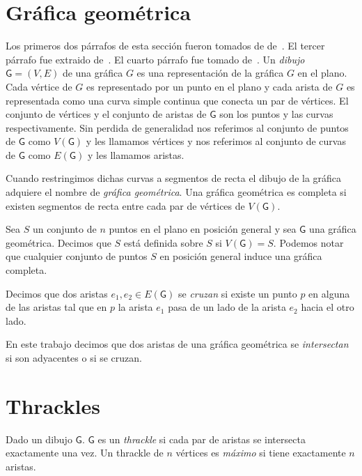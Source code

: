 \section{Gráfica geométrica}
Los primeros dos párrafos de esta sección fueron tomados de de~\cite{Pach2013}. El tercer párrafo
fue extraido de~\cite{Lara2019}. El cuarto párrafo fue tomado de~\cite{Pach2011}.
Un \emph{dibujo} $\mathsf{G}=(V,E)$ de una gráfica $G$ es una representación de la
gráfica $G$ en el plano. Cada vértice de $G$ es representado por un punto en el plano
y cada arista de $G$ es representada como una curva simple continua que conecta un par de vértices.
El conjunto de vértices y el conjunto de aristas de $\mathsf{G}$
son los puntos y las curvas respectivamente. Sin perdida de generalidad nos referimos al
conjunto de puntos de $\mathsf{G}$ como $V(\mathsf{G})$ y les llamamos vértices y nos
referimos al conjunto de curvas de $\mathsf{G}$ como $E(\mathsf{G})$ y les llamamos aristas.

Cuando restringimos dichas curvas a segmentos de recta el dibujo de la gráfica
adquiere el nombre de \emph{gráfica geométrica}. Una gráfica
geométrica es completa si existen segmentos de recta entre cada par de vértices
de $V(\mathsf{G})$.

Sea $S$ un conjunto de $n$ puntos en el plano en posición general y sea $\mathsf{G}$
una gráfica geométrica. Decimos que $S$ está definida sobre $S$ si $V(\mathsf{G}) = S$.
Podemos notar que cualquier conjunto de puntos $S$ en posición
general induce una gráfica completa.

Decimos que dos aristas $e_1,e_2 \in E(\mathsf{G})$ se \emph{cruzan} si existe un punto $p$
en alguna de las aristas tal que en $p$ la arista $e_1$ pasa de un lado de la arista
$e_2$ hacia el otro lado.

En este trabajo decimos que dos aristas de una gráfica geométrica se \emph{intersectan}
si son adyacentes o si se cruzan.

\section{Thrackles}
Dado un dibujo $\mathsf{G}$. $\mathsf{G}$ es un \emph{thrackle} si cada par de aristas
se intersecta exactamente una vez. Un thrackle de $n$ vértices
es \emph{máximo} si tiene exactamente $n$ aristas.

